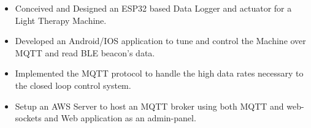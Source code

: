 \documentclass[10pt,a4paper,ragged2e]{altacv}
\begin{document}

\begin{fullwidth}
\makecvheader
\end{fullwidth}




\begin{itemize}
    \item Conceived and Designed an ESP32 based Data Logger and actuator for a Light Therapy Machine.
    \item Developed an Android/IOS application to tune and control the Machine over MQTT and read BLE beacon's data.
    \item Implemented the MQTT protocol to handle the high data rates necessary to the closed loop control system.
    \item Setup an AWS Server to host an MQTT broker using both MQTT and web-sockets and Web application as an admin-panel.
\end{itemize}

\vspace{10px}
\end{document}

